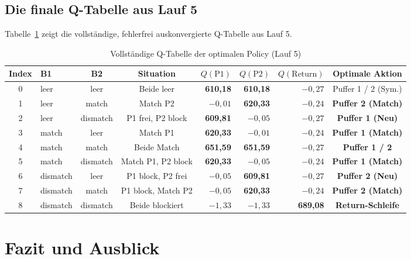 \documentclass[11pt,a4paper]{article}
\begin{document}
\subsection{Die finale Q-Tabelle aus Lauf 5}
Tabelle~\ref{tab:finale_q_tabelle} zeigt die vollständige, fehlerfrei auskonvergierte Q-Tabelle aus Lauf 5.

\begin{table}[htbp]
\centering
\caption{Vollständige Q-Tabelle der optimalen Policy (Lauf 5)}
\label{tab:finale_q_tabelle}
\begin{tabular}{@{}c lcc rrr c@{}}
\toprule
\textbf{Index} & \textbf{B1} & \textbf{B2} & \textbf{Situation} & \textbf{$Q(\text{P1})$} & \textbf{$Q(\text{P2})$} & \textbf{$Q(\text{Return})$} & \textbf{Optimale Aktion} \\
\midrule
0 & leer & leer & Beide leer & \textbf{610,18} & \textbf{610,18} & $-0,27$ & Puffer 1 / 2 (Sym.) \\
1 & leer & match & Match P2 & $-0,01$ & \textbf{620,33} & $-0,24$ & \textbf{Puffer 2 (Match)} \\
2 & leer & dismatch & P1 frei, P2 block & \textbf{609,81} & $-0,05$ & $-0,27$ & \textbf{Puffer 1 (Neu)} \\
3 & match & leer & Match P1 & \textbf{620,33} & $-0,01$ & $-0,24$ & \textbf{Puffer 1 (Match)} \\
4 & match & match & Beide Match & \textbf{651,59} & \textbf{651,59} & $-0,27$ & \textbf{Puffer 1 / 2} \\
5 & match & dismatch & Match P1, P2 block & \textbf{620,33} & $-0,05$ & $-0,24$ & \textbf{Puffer 1 (Match)} \\
6 & dismatch & leer & P1 block, P2 frei & $-0,05$ & \textbf{609,81} & $-0,27$ & \textbf{Puffer 2 (Neu)} \\
7 & dismatch & match & P1 block, Match P2 & $-0,05$ & \textbf{620,33} & $-0,24$ & \textbf{Puffer 2 (Match)} \\
8 & dismatch & dismatch & Beide blockiert & $-1,33$ & $-1,33$ & \textbf{689,08} & \textbf{Return-Schleife} \\
\bottomrule
\end{tabular}
\end{table}

\section{Fazit und Ausblick}
\end{document}
